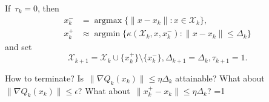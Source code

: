 \documentclass[12pt,a4paper,draft]{article}  %
\newcommand{\bibfile}{\jobname.bib}  %
\newcommand{\iscite}{0}  %
\theoremstyle{definition}
\numberwithin{equation}{section}
\DeclareMathOperator*{\argmax}{argmax}
\DeclareMathOperator*{\argmin}{argmin}
\newcommand{\Int}{\mathcal{X}}
\begin{document}
\begin{algorithm}[htbp!]
\begin{algorithmic}[1]
          \State If~$\tau_k=0$, then
          \begin{align}
              \label{eq:}
              x_k^{-} &= \argmax\{\|x-x_k\| \mathrel{:} x \in \Int_k\}, \\
              \label{eq:}
              x_k^{+} &\approx \argmin\{\kappa(\Int_k, x, x_k^{-}) \mathrel{:} \|x-x_k\|\le
              \Delta_k\}
          \end{align}
          and set
          \begin{equation}
              \label{eq:}
              \Int_{k+1} = \Int_k\cup\{x_k^{+}\}\setminus\{x_k^{-}\},
              \Delta_{k+1} = \Delta_k,
              \tau_{k+1} = 1.
          \end{equation}
    \end{algorithmic}
\end{algorithm}

How to terminate? Is~$\|\nabla Q_k(x_k)\| \le \eta \Delta_k$ attainable? What about~$\|\nabla
Q_k(x_k)\| \le \epsilon$? What about~$\|x_k^+-x_k\| \le \eta \Delta_k$?
\ifnum\iscite=1
    \small
    
    
\fi

\end{document}
